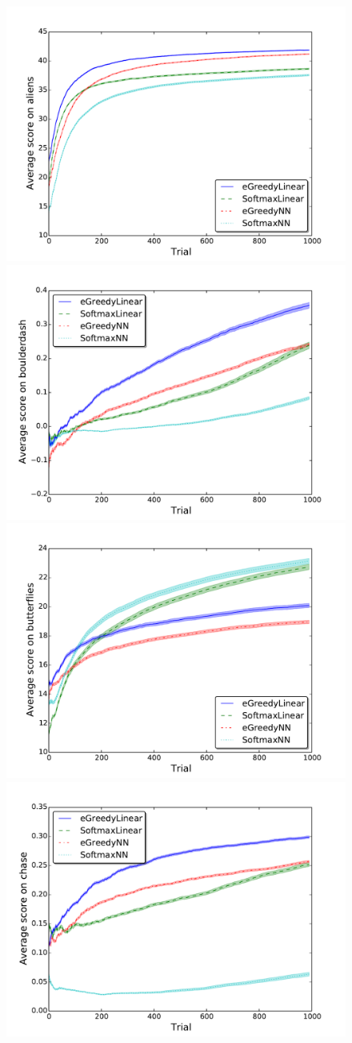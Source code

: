 \documentclass[conference]{IEEEtran}
\begin{document}
\begin{figure}[!t]
	\begin{center}
	\includegraphics[width = .45\textwidth]{img/aliens_scores}
	\includegraphics[width = .45\textwidth]{img/boulderdash_scores}\\
	\includegraphics[width = .45\textwidth]{img/butterflies_scores}
	\includegraphics[width = .45\textwidth]{img/chase_scores}\\


\end{center}
\end{figure}
\end{document}
